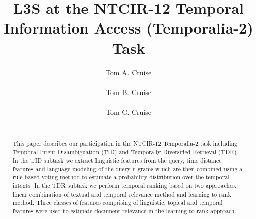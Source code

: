 \documentclass{sig-alternate}
\begin{document}
\title{L3S at the NTCIR-12 Temporal Information Access (Temporalia-2) Task}

\author{
%
%
\alignauthor
Tom A. Cruise\\
       \\
\alignauthor
Tom B. Cruise\\
       \\
\alignauthor 
Tom C. Cruise\\
       \\
}


\maketitle

\begin{abstract}
This paper describes our participation in the NTCIR-12 Temporalia-2 task including Temporal Intent Disambiguation (TID) and Temporally Diversified Retrieval (TDR). In the TID subtask we extract linguistic features from the query, time distance features and language modeling of the query n-grams which are then combined using a rule based voting method to estimate a probability distribution over the temporal intents. In the TDR subtask we perform temporal ranking based on two approaches, linear combination of textual and temporal relevance method and learning to rank method. Three classes of features comprising of linguistic, topical and temporal features were used to estimate document relevance in the learning to rank approach.

\end{abstract}
\end{document}
